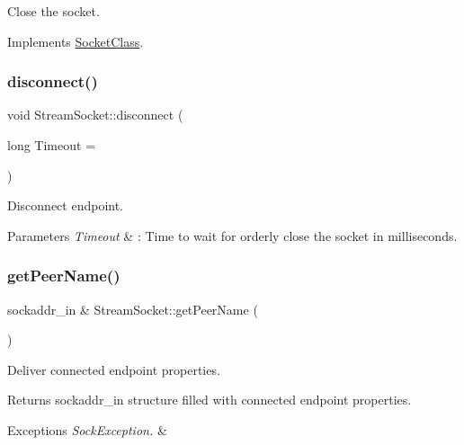 Close the socket. 



Implements \hyperlink{classSocketClass_a92c8c1b22b98f0231932cbd84cdc4cfe}{Socket\+Class}.

\mbox{\label{classStreamSocket_a01cd43dea5b792a72d741288f840b08b}} 
\subsubsection{\texorpdfstring{disconnect()}{disconnect()}}
{\footnotesize\ttfamily void Stream\+Socket\+::disconnect (\begin{DoxyParamCaption}\item[{long}]{Timeout = {} }\end{DoxyParamCaption})}

Disconnect endpoint. 
\begin{DoxyParams}{Parameters}
{\em Timeout} & \+: Time to wait for orderly close the socket in milliseconds. \\
\hline
\end{DoxyParams}
\mbox{\label{classStreamSocket_ab9065328673e08e0fb5df8eefda3604d}} 
\subsubsection{\texorpdfstring{get\+Peer\+Name()}{getPeerName()}}
{\footnotesize\ttfamily sockaddr\+\_\+in \& Stream\+Socket\+::get\+Peer\+Name (\begin{DoxyParamCaption}{ }\end{DoxyParamCaption})}

Deliver connected endpoint properties. \begin{DoxyReturn}{Returns}
sockaddr\+\_\+in structure filled with connected endpoint properties. 
\end{DoxyReturn}

\begin{DoxyExceptions}{Exceptions}
{\em Sock\+Exception.} & \\
\hline
\end{DoxyExceptions}
\mbox{\label{classStreamSocket_ab634d93813e97a292ae8b29fd9d39bcd}} 
